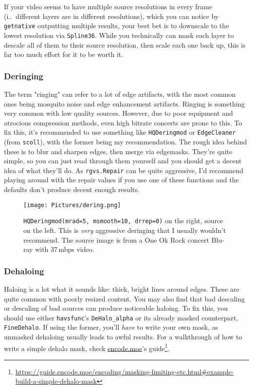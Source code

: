 \documentclass{scrartcl}
\begin{document}
If your video seems to have multiple source resolutions in every frame (i.\@e.\ different layers are in different resolutions), which you can notice by \texttt{getnative} outputting multiple results, your best bet is to downscale to the lowest resolution via \texttt{Spline36}.  While you technically can mask each layer to descale all of them to their source resolution, then scale each one back up, this is far too much effort for it to be worth it.

\subsubsection{Deringing}

The term "ringing" can refer to a lot of edge artifacts, with the most common ones being mosquito noise and edge enhancement artifacts.  Ringing is something very common with low quality sources.  However, due to poor equipment and atrocious compression methods, even high bitrate concerts are prone to this.
To fix this, it's recommended to use something like \texttt{HQDeringmod} or \texttt{EdgeCleaner} (from \texttt{scoll}), with the former being my recommendation.  The rough idea behind these is to blur and sharpen edges, then merge via edgemasks.  They're quite simple, so you can just read through them yourself and you should get a decent idea of what they'll do.  As \texttt{rgvs.Repair} can be quite aggressive, I'd recommend playing around with the repair values if you use one of these functions and the defaults don't produce decent enough results.

\begin{figure}[h]
\texttt{[image: Pictures/dering.png]}
\centering
\caption{\texttt{HQDeringmod(mrad=5, msmooth=10, drrep=0)} on the right, source on the left.  This is \textit{very} aggressive deringing that I usually wouldn't recommend.  The source image is from a One Ok Rock concert Blu-ray with 37\,mbps video.}\label{fig:17}
\end{figure}

\subsubsection{Dehaloing}

Haloing is a lot what it sounds like: thick, bright lines around edges.  These are quite common with poorly resized content.  You may also find that bad descaling or descaling of bad sources can produce noticeable haloing.  To fix this, you should use either \texttt{havsfunc}'s \texttt{DeHalo\_alpha} or its already masked counterpart, \texttt{FineDehalo}.  If using the former, you'll \textit{have} to write your own mask, as unmasked dehaloing usually leads to awful results.  For a walkthrough of how to write a simple dehalo mask, check \url{encode.moe}'s guide\footnote{\url{https://guide.encode.moe/encoding/masking-limiting-etc.html\#example-build-a-simple-dehalo-mask}}.
\end{document}
